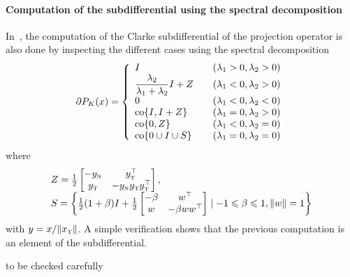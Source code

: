 \paragraph{Computation of the subdifferential using the spectral decomposition}


In~\cite{Hayashi.ea_SIOPT2005}, the computation of the Clarke subdifferential of the projection operator is also done by inspecting the different cases using the spectral decomposition
\begin{equation}
  \label{eq:Jordan-projection-Jacobian}
  \partial P_K(x) =
  \left\{
    \begin{array}{ll}
      I & \quad (\lambda_1>0, \lambda_2 >0 ) \\
      \Frac{\lambda_2}{\lambda_1+\lambda_2} I +Z & \quad (\lambda_1< 0, \lambda_2 >0 ) \\
      0 & \quad (\lambda_1< 0, \lambda_2 <0 ) \\
      \co\{I, I+Z\} & \quad (\lambda_1=0, \lambda_2 >0 ) \\
      \co\{0, Z\} & \quad (\lambda_1<0, \lambda_2 =0 ) \\
      \co\{0 \cup  I \cup S\}  & \quad (\lambda_1=0, \lambda_2 =0 )
    \end{array}
  \right.
\end{equation}
where
\begin{equation}
  \label{eq:Jordan-projection-Jacobian2}
  \begin{array}{l}
  Z  = \frac 1 2
  \begin{bmatrix}
    - y_\n & y_\t^\top\\
    y_\t & - y_\n y_\t y_\t^\top
  \end{bmatrix},\\
  S = \left\{\frac 1 2 (1+\beta) I + \frac 1 2
    \begin{bmatrix}
      -\beta & w^\top \\
      w & -\beta w w^\top
    \end{bmatrix}\mid -1 \leq \beta \leq 1, \|w\|=1\right\}
\end{array}
\end{equation}
with $y = x / \|x_{\hbox{\tiny{T}}}\|$. A simple verification shows that the previous computation is an element of the subdifferential.



\begin{ndrva}
  to be checked carefully
\end{ndrva}




